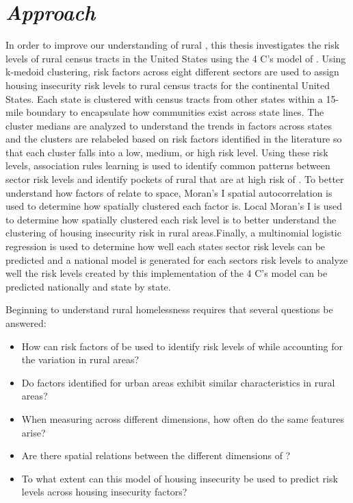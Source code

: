 \section{\textit{Approach}}
In order to improve our understanding of rural \hs, this thesis investigates the risk levels of rural census tracts in the United States  using the 4 C's model of \hs. Using k-medoid clustering, risk factors across eight different sectors are used to assign housing insecurity risk levels to rural census tracts for the continental United States. Each state is clustered with census tracts from other states within a 15-mile boundary to encapsulate how communities exist across state lines. The cluster medians are analyzed to understand the trends in \hs factors across states and the clusters are relabeled based on risk factors identified in the literature so that each cluster falls into a low, medium, or high risk level. Using these risk levels, association rules learning is used to identify common patterns between sector risk levels and identify pockets of rural \ct that are at high risk of \hs. To better understand how factors of \hs relate to space, Moran's I spatial autocorrelation is used to determine how spatially clustered each \hs factor is. Local Moran's I is used to determine how spatially clustered each risk level is to better understand the clustering of housing insecurity risk in rural areas.Finally, a multinomial logistic regression is used to determine how well each states sector risk levels can be predicted and a national model is generated for each sectors risk levels to analyze well the risk levels created by this implementation of the 4 C's model can be predicted nationally and state by state. 

Beginning to understand rural homelessness requires that several questions be answered:
\begin{itemize}
    \item How can risk factors of be used to identify risk levels of \hs while accounting for the variation in rural areas? 
    \item Do \hs factors identified for urban areas exhibit similar characteristics in rural areas? 
    \item When measuring \hs across different dimensions, how often do the same features arise?
    \item Are there spatial relations between the different dimensions of \hs? 
    \item To what extent can this model of housing insecurity be used to predict risk levels across housing insecurity factors?

\end{itemize}
